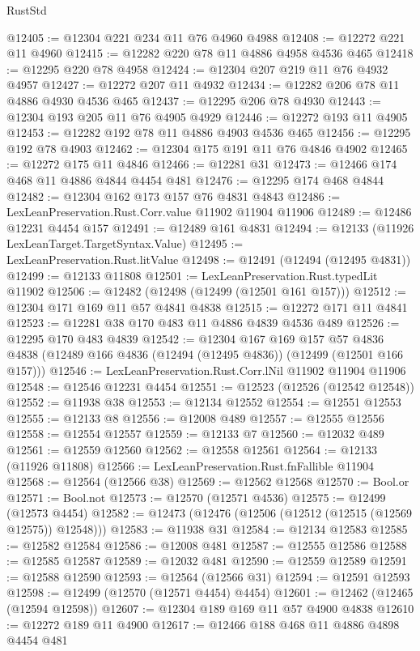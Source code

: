 \begin{lexlean}{RustStd}
\begin{coremodule}
{\begin{coremodule}
{{{{{{{{{{{{{{{{{{{{{{{{{{{{{{{{{{{{{{{{{{{{{{{{{{{{{{{{{{{{{{{{{{{{{{{{{{{{{{{{@12405 := @12304 @221 @234 @11 @76 @4960 @4988
@12408 := @12272 @221 @11 @4960
@12415 := @12282 @220 @78 @11 @4886 @4958 @4536 @465
@12418 := @12295 @220 @78 @4958
@12424 := @12304 @207 @219 @11 @76 @4932 @4957
@12427 := @12272 @207 @11 @4932
@12434 := @12282 @206 @78 @11 @4886 @4930 @4536 @465
@12437 := @12295 @206 @78 @4930
@12443 := @12304 @193 @205 @11 @76 @4905 @4929
@12446 := @12272 @193 @11 @4905
@12453 := @12282 @192 @78 @11 @4886 @4903 @4536 @465
@12456 := @12295 @192 @78 @4903
@12462 := @12304 @175 @191 @11 @76 @4846 @4902
@12465 := @12272 @175 @11 @4846
@12466 := @12281 @31
@12473 := @12466 @174 @468 @11 @4886 @4844 @4454 @481
@12476 := @12295 @174 @468 @4844
@12482 := @12304 @162 @173 @157 @76 @4831 @4843
@12486 := LexLeanPreservation.Rust.Corr.value @11902 @11904 @11906
@12489 := @12486 @12231 @4454 @157
@12491 := @12489 @161 @4831
@12494 := @12133 (@11926 LexLeanTarget.TargetSyntax.Value)
@12495 := LexLeanPreservation.Rust.litValue
@12498 := @12491 (@12494 (@12495 @4831))
@12499 := @12133 @11808
@12501 := LexLeanPreservation.Rust.typedLit @11902
@12506 := @12482 (@12498 (@12499 (@12501 @161 @157)))
@12512 := @12304 @171 @169 @11 @57 @4841 @4838
@12515 := @12272 @171 @11 @4841
@12523 := @12281 @38 @170 @483 @11 @4886 @4839 @4536 @489
@12526 := @12295 @170 @483 @4839
@12542 := @12304
    @167
    @169
    @157
    @57
    @4836
    @4838
    (@12489 @166 @4836 (@12494 (@12495 @4836)) (@12499 (@12501 @166 @157)))
@12546 := LexLeanPreservation.Rust.Corr.lNil @11902 @11904 @11906
@12548 := @12546 @12231 @4454
@12551 := @12523 (@12526 (@12542 @12548))
@12552 := @11938 @38
@12553 := @12134 @12552
@12554 := @12551 @12553
@12555 := @12133 @8
@12556 := @12008 @489
@12557 := @12555 @12556
@12558 := @12554 @12557
@12559 := @12133 @7
@12560 := @12032 @489
@12561 := @12559 @12560
@12562 := @12558 @12561
@12564 := @12133 (@11926 @11808)
@12566 := LexLeanPreservation.Rust.fnFallible @11904
@12568 := @12564 (@12566 @38)
@12569 := @12562 @12568
@12570 := Bool.or
@12571 := Bool.not
@12573 := @12570 (@12571 @4536)
@12575 := @12499 (@12573 @4454)
@12582 := @12473 (@12476 (@12506 (@12512 (@12515 (@12569 @12575)) @12548)))
@12583 := @11938 @31
@12584 := @12134 @12583
@12585 := @12582 @12584
@12586 := @12008 @481
@12587 := @12555 @12586
@12588 := @12585 @12587
@12589 := @12032 @481
@12590 := @12559 @12589
@12591 := @12588 @12590
@12593 := @12564 (@12566 @31)
@12594 := @12591 @12593
@12598 := @12499 (@12570 (@12571 @4454) @4454)
@12601 := @12462 (@12465 (@12594 @12598))
@12607 := @12304 @189 @169 @11 @57 @4900 @4838
@12610 := @12272 @189 @11 @4900
@12617 := @12466 @188 @468 @11 @4886 @4898 @4454 @481
}}}}}}}}}}}}}}}}}}}}}}}}}}}}}}}}}}}}}}}}}}}}}}}}}}}}}}}}}}}}}}}}}}}}}}}}}}}}}}}}
\end{coremodule}}
\end{coremodule}
\end{lexlean}
